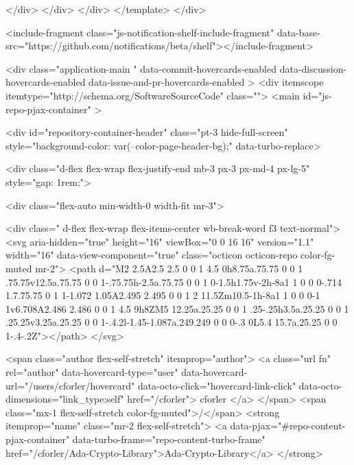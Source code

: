     </div>
  </div>
</div>
  </template>
</div>


    
    <include-fragment class="js-notification-shelf-include-fragment" data-base-src="https://github.com/notifications/beta/shelf"></include-fragment>






  <div
    class="application-main "
    data-commit-hovercards-enabled
    data-discussion-hovercards-enabled
    data-issue-and-pr-hovercards-enabled
  >
        <div itemscope itemtype="http://schema.org/SoftwareSourceCode" class="">
    <main id="js-repo-pjax-container" >
      
  


    






  
  <div id="repository-container-header"  class="pt-3 hide-full-screen" style="background-color: var(--color-page-header-bg);" data-turbo-replace>

      <div class="d-flex flex-wrap flex-justify-end mb-3  px-3 px-md-4 px-lg-5" style="gap: 1rem;">

        <div class="flex-auto min-width-0 width-fit mr-3">
            
  <div class=" d-flex flex-wrap flex-items-center wb-break-word f3 text-normal">
      <svg aria-hidden="true" height="16" viewBox="0 0 16 16" version="1.1" width="16" data-view-component="true" class="octicon octicon-repo color-fg-muted mr-2">
    <path d="M2 2.5A2.5 2.5 0 0 1 4.5 0h8.75a.75.75 0 0 1 .75.75v12.5a.75.75 0 0 1-.75.75h-2.5a.75.75 0 0 1 0-1.5h1.75v-2h-8a1 1 0 0 0-.714 1.7.75.75 0 1 1-1.072 1.05A2.495 2.495 0 0 1 2 11.5Zm10.5-1h-8a1 1 0 0 0-1 1v6.708A2.486 2.486 0 0 1 4.5 9h8ZM5 12.25a.25.25 0 0 1 .25-.25h3.5a.25.25 0 0 1 .25.25v3.25a.25.25 0 0 1-.4.2l-1.45-1.087a.249.249 0 0 0-.3 0L5.4 15.7a.25.25 0 0 1-.4-.2Z"></path>
</svg>
    
    <span class="author flex-self-stretch" itemprop="author">
      <a class="url fn" rel="author" data-hovercard-type="user" data-hovercard-url="/users/cforler/hovercard" data-octo-click="hovercard-link-click" data-octo-dimensions="link_type:self" href="/cforler">
        cforler
</a>    </span>
    <span class="mx-1 flex-self-stretch color-fg-muted">/</span>
    <strong itemprop="name" class="mr-2 flex-self-stretch">
      <a data-pjax="#repo-content-pjax-container" data-turbo-frame="repo-content-turbo-frame" href="/cforler/Ada-Crypto-Library">Ada-Crypto-Library</a>
    </strong>

